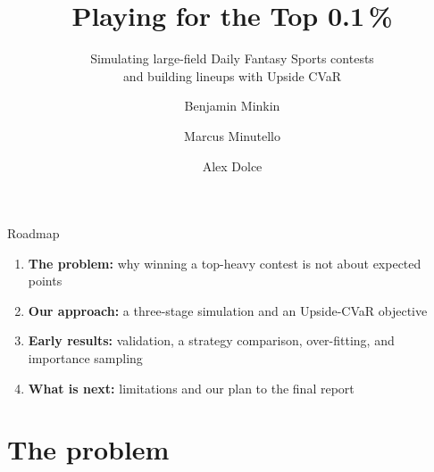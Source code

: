 %
%



\title{Playing for the Top 0.1\,\%}
\subtitle{Simulating large-field Daily Fantasy Sports contests\\
  and building lineups with Upside CVaR}
\author{Benjamin Minkin \and Marcus Minutello \and Alex Dolce}
\date{}



\begin{frame}[plain]
  \titlepage
\end{frame}

\begin{frame}{Roadmap}
  \begin{enumerate}
    \setlength\itemsep{0.8em}
    \item \textbf{The problem:} why winning a top-heavy contest is not about expected points
    \item \textbf{Our approach:} a three-stage simulation and an Upside-CVaR objective
    \item \textbf{Early results:} validation, a strategy comparison, over-fitting, and
      importance sampling
    \item \textbf{What is next:} limitations and our plan to the final report
  \end{enumerate}
\end{frame}

\section{The problem}

